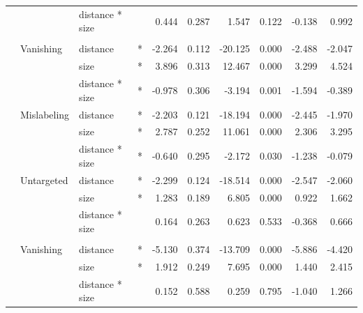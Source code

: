 \begin{longtable}[t]{llllrrrrrr}
\cmidrule{3-10}\nopagebreak
\hspace{1em} &  & distance * size &  & 0.444 & 0.287 & 1.547 & 0.122 & -0.138 & 0.992\\
\cmidrule{1-10}\pagebreak[0]
\addlinespace[0.3em]
\multicolumn{10}{l}{\textbf{SSD}}\\
\hspace{1em} & Vanishing & distance & * & -2.264 & 0.112 & -20.125 & 0.000 & -2.488 & -2.047\\
\cmidrule{3-10}\nopagebreak
\hspace{1em} &  & size & * & 3.896 & 0.313 & 12.467 & 0.000 & 3.299 & 4.524\\
\cmidrule{3-10}\nopagebreak
\hspace{1em} &  & distance * size & * & -0.978 & 0.306 & -3.194 & 0.001 & -1.594 & -0.389\\
\cmidrule{2-10}\nopagebreak
\hspace{1em} & Mislabeling & distance & * & -2.203 & 0.121 & -18.194 & 0.000 & -2.445 & -1.970\\
\cmidrule{3-10}\nopagebreak
\hspace{1em} &  & size & * & 2.787 & 0.252 & 11.061 & 0.000 & 2.306 & 3.295\\
\cmidrule{3-10}\nopagebreak
\hspace{1em} &  & distance * size & * & -0.640 & 0.295 & -2.172 & 0.030 & -1.238 & -0.079\\
\cmidrule{2-10}\nopagebreak
\hspace{1em} & Untargeted & distance & * & -2.299 & 0.124 & -18.514 & 0.000 & -2.547 & -2.060\\
\cmidrule{3-10}\nopagebreak
\hspace{1em} &  & size & * & 1.283 & 0.189 & 6.805 & 0.000 & 0.922 & 1.662\\
\cmidrule{3-10}\nopagebreak
\hspace{1em} &  & distance * size &  & 0.164 & 0.263 & 0.623 & 0.533 & -0.368 & 0.666\\
\cmidrule{1-10}\pagebreak[0]
\addlinespace[0.3em]
\multicolumn{10}{l}{\textbf{RetinaNet}}\\
\hspace{1em} & Vanishing & distance & * & -5.130 & 0.374 & -13.709 & 0.000 & -5.886 & -4.420\\
\cmidrule{3-10}\nopagebreak
\hspace{1em} &  & size & * & 1.912 & 0.249 & 7.695 & 0.000 & 1.440 & 2.415\\
\cmidrule{3-10}\nopagebreak
\hspace{1em} &  & distance * size &  & 0.152 & 0.588 & 0.259 & 0.795 & -1.040 & 1.266\\

\end{longtable}
